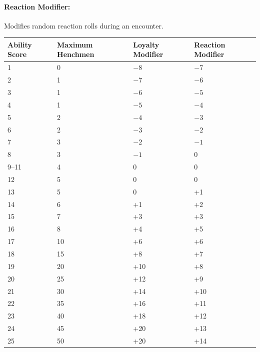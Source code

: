 \begin{multicols}{2}
\paragraph{Reaction Modifier:}  Modifies random reaction rolls during an encounter.


\noindent
\begin{minipage}{\columnwidth}

\label{charismascores}
\noindent
\begin{tabular}{|m{}|m{}|m{}|m{}|}
\hline
Ability Score	& Maximum Henchmen	& Loyalty Modifier	& Reaction Modifier \\
\hline\hline
\rowcolor[gray]{.9}1	& 0	& $-8$	& $-7$ \\
2	& 1	& $-7$	& $-6$ \\
\rowcolor[gray]{.9}3	& 1	& $-6$	& $-5$ \\
4	& 1	& $-5$	& $-4$ \\
\rowcolor[gray]{.9}5	& 2	& $-4$	& $-3$ \\
6	& 2	& $-3$	& $-2$ \\
\rowcolor[gray]{.9}7	& 3	& $-2$	& $-1$ \\
8	& 3	& $-1$	& 0 \\
\rowcolor[gray]{.9}9--11	& 4	& 0	& 0 \\
12	& 5	& 0	& 0 \\
\rowcolor[gray]{.9}13	& 5	& 0	& +1 \\
14	& 6	& +1	& +2 \\
\rowcolor[gray]{.9}15	& 7	& +3	& +3 \\
16	& 8	& +4	& +5 \\
\rowcolor[gray]{.9}17	& 10	& +6	& +6 \\
18	& 15	& +8	& +7 \\
\rowcolor[gray]{.9}19	& 20	& +10	& +8 \\
20	& 25	& +12	& +9 \\
\rowcolor[gray]{.9}21	& 30	& +14	& +10 \\
22	& 35	& +16	& +11 \\
\rowcolor[gray]{.9}23	& 40	& +18	& +12 \\
24	& 45	& +20	& +13 \\
\rowcolor[gray]{.9}25	& 50	& +20	& +14 \\
\hline
\end{tabular}

\end{minipage}

\end{multicols}

\pagebreak

\thispagestyle{empty}

\label{truedaemon}
